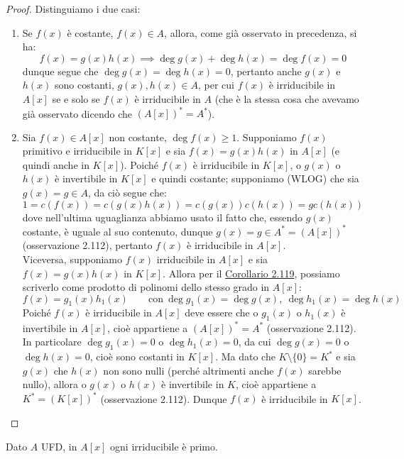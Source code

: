 \documentclass[11pt]{scrartcl}
\begin{document}
\begin{proof}
    Distinguiamo i due casi:
    \begin{enumerate}
        \item Se $f(x)$ è costante, $f(x) \in A$, allora, come già osservato in precedenza, si ha:
        \[ f(x) = g(x)h(x) \implies \deg g(x) + \deg h(x) = \deg f(x) = 0
            \]
        dunque segue che $\deg g(x) = \deg h(x) =  0$, pertanto anche $g(x)$ e $h(x)$ sono costanti, $g(x), h(x) \in A$,
        per cui $f(x)$ è irriducibile in $A[x]$ se e solo se $f(x)$ è irriducibile in $A$ (che è la stessa cosa che avevamo già osservato dicendo che $(A[x])^* = A^*$).
        \item Sia $f(x) \in A[x]$ non costante, $\deg f(x) \geq 1$. 
	Supponiamo $f(x)$ primitivo e irriducibile in $K[x]$ e sia $f(x) = g(x)h(x)$ in $A[x]$ (e quindi anche in $K[x]$). Poiché $f(x)$ è irriducibile in $K[x]$, 
        o $g(x)$ o $h(x)$ è invertibile in $K[x]$ e quindi costante; supponiamo (WLOG) che sia $g(x) = g \in A$, da ciò segue che:
        \[ 1 = c(f(x)) = c(g(x)h(x)) = c(g(x))c(h(x)) = g c(h(x))
            \]
        dove nell'ultima uguaglianza abbiamo usato il fatto che, essendo $g(x)$ costante, è uguale al suo contenuto,
	dunque $g(x) = g \in A^* = (A[x])^*$ (osservazione 2.112), pertanto $f(x)$ è irriducibile in $A[x]$. \\
	Viceversa, supponiamo $f(x)$ irriducibile in $A[x]$ e sia $f(x) = g(x)h(x)$ in $K[x]$.
	Allora per il \hyperref[2.119]{Corollario 2.119}, possiamo scriverlo come prodotto di polinomi dello stesso grado in $A[x]$:
        \[ f(x) = g_1(x)h_1(x) \qquad \text{con} ~ \deg g_1(x) = \deg g(x), ~ \deg h_1(x) = \deg h(x)
            \]
        Poiché $f(x)$ è irriducibile in $A[x]$ deve essere che o $g_1(x)$ o $h_1(x)$ è invertibile in $A[x]$, cioè appartiene a $(A[x])^* = A^*$ (osservazione 2.112). 
	In particolare $\deg g_1(x) = 0$ o $\deg h_1(x) = 0$, da cui $\deg g(x) = 0$ o $\deg h(x) = 0$, cioè sono costanti in $K[x]$. 
	Ma dato che $K \setminus \{0\} = K^*$ e sia $g(x)$ che $h(x)$ non sono nulli (perché altrimenti anche $f(x)$ sarebbe nullo), allora o $g(x)$ o $h(x)$ è invertibile in $K$, cioè appartiene a $K^* = (K[x])^*$ (osservazione 2.112).
	Dunque $f(x)$ è irriducibile in $K[x]$.
    \end{enumerate}
\end{proof}

\begin{proposition}
    Dato $A$ UFD, in $A[x]$ ogni irriducibile è primo.
\end{proposition}
\end{document}
